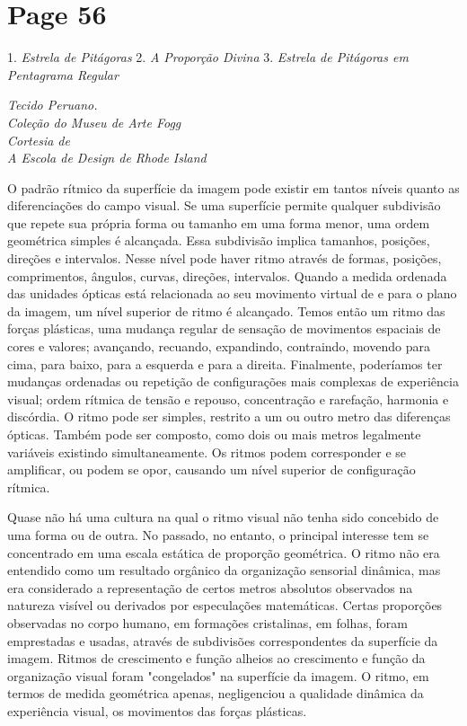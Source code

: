 \documentclass[a4paper]{article}
\begin{document}
\vspace*{\fill}

\newpage
\section*{Page 56}

\raggedright

1. \textit{Estrela de Pitágoras}
2. \textit{A Proporção Divina}
3. \textit{Estrela de Pitágoras em}
   \textit{Pentagrama Regular}

\textit{Tecido Peruano.} \\
\textit{Coleção do Museu de Arte Fogg} \\
\textit{Cortesia de} \\
\textit{A Escola de Design de Rhode Island}

O padrão rítmico da superfície da imagem pode existir em tantos níveis quanto as diferenciações do campo visual. Se uma superfície permite qualquer subdivisão que repete sua própria forma ou tamanho em uma forma menor, uma ordem geométrica simples é alcançada. Essa subdivisão implica tamanhos, posições, direções e intervalos. Nesse nível pode haver ritmo através de formas, posições, comprimentos, ângulos, curvas, direções, intervalos. Quando a medida ordenada das unidades ópticas está relacionada ao seu movimento virtual de e para o plano da imagem, um nível superior de ritmo é alcançado. Temos então um ritmo das forças plásticas, uma mudança regular de sensação de movimentos espaciais de cores e valores; avançando, recuando, expandindo, contraindo, movendo para cima, para baixo, para a esquerda e para a direita. Finalmente, poderíamos ter mudanças ordenadas ou repetição de configurações mais complexas de experiência visual; ordem rítmica de tensão e repouso, concentração e rarefação, harmonia e discórdia. O ritmo pode ser simples, restrito a um ou outro metro das diferenças ópticas. Também pode ser composto, como dois ou mais metros legalmente variáveis existindo simultaneamente. Os ritmos podem corresponder e se amplificar, ou podem se opor, causando um nível superior de configuração rítmica.

Quase não há uma cultura na qual o ritmo visual não tenha sido concebido de uma forma ou de outra. No passado, no entanto, o principal interesse tem se concentrado em uma escala estática de proporção geométrica. O ritmo não era entendido como um resultado orgânico da organização sensorial dinâmica, mas era considerado a representação de certos metros absolutos observados na natureza visível ou derivados por especulações matemáticas. Certas proporções observadas no corpo humano, em formações cristalinas, em folhas, foram emprestadas e usadas, através de subdivisões correspondentes da superfície da imagem. Ritmos de crescimento e função alheios ao crescimento e função da organização visual foram "congelados" na superfície da imagem. O ritmo, em termos de medida geométrica apenas, negligenciou a qualidade dinâmica da experiência visual, os movimentos das forças plásticas.
\end{document}
